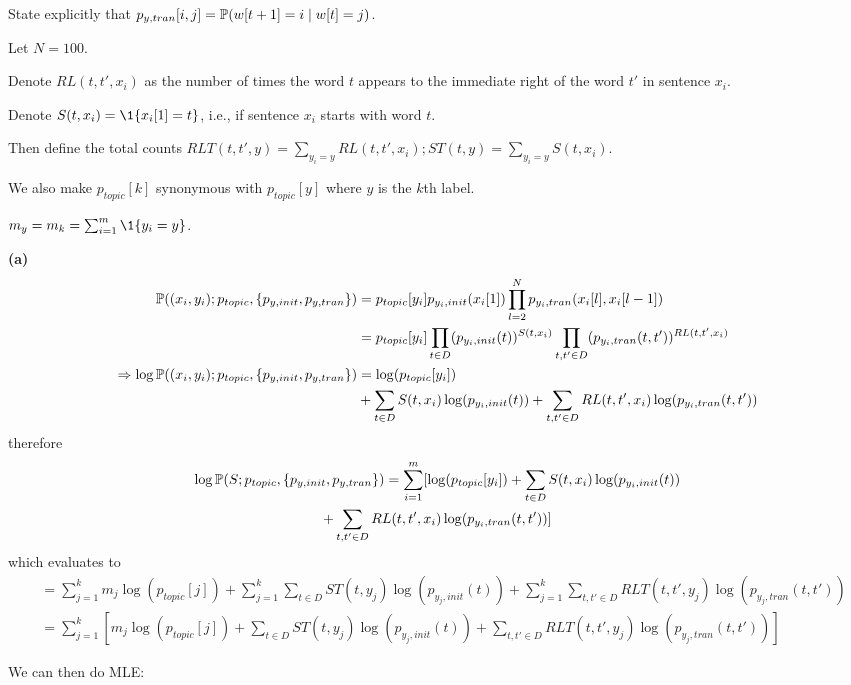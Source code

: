 \documentclass[a4paper, 11pt]{article}
\begin{document}
\begin{problem} 
State explicitly that $p_{y, tran}[i, j] = \mathbb{P} (w[t+1] = i \mid w[t] = j)$.

Let $N = 100$.

Denote $RL(t, t', x_i)$ as the number of times the word $t$ appears to the immediate right of the word $t'$ in sentence $x_i$.

Denote $S(t, x_i) = \1 \{x_i[1] = t\}$, i.e., if sentence $x_i$ starts with word $t$. 

Then define the total counts $RLT(t, t', y) = \sum_{y_i = y} RL(t, t', x_i); ST(t, y) = \sum_{y_i = y} S(t, x_i)$.

We also make $p_{topic}[k]$ synonymous with $p_{topic}[y]$ where $y$ is the $k$th label.

$m_{y} = m_k = \sum_{i=1}^{m} \1 \{y_i = y\}$.

\textbf{(a)} \begin{align*}
\mathbb{P}((x_i, y_i); p_{topic}, \{p_{y, init}, p_{y, tran}\}) &= p_{topic}[y_i]p_{y_i, init}(x_i[1]) \prod_{l=2}^{N} p_{y_i, tran}(x_i[l],  x_i[l-1]) \\
&= p_{topic}[y_i] \prod_{t \in D} (p_{y_i, init}(t))^{S(t, x_i)} \prod_{t, t' \in D} (p_{y_i, tran}(t, t'))^{RL(t, t', x_i)}\\
\Rightarrow \log \mathbb{P}((x_i, y_i); p_{topic}, \{p_{y, init}, p_{y, tran}\}) &=\log(p_{topic}[y_i]) \\
&+ \sum_{t \in D} S(t, x_i) \log (p_{y_i, init}(t)) + \sum_{t, t' \in D} RL(t, t', x_i) \log(p_{y_i, tran}(t, t'))
\end{align*}
therefore \begin{multline*}
    \log \mathbb{P}(S; p_{topic},  \{p_{y, init}, p_{y, tran}\}) = \sum_{i=1}^{m} [\log (p_{topic}[y_i]) + \sum_{t \in D} S(t, x_i) \log(p_{y_i, init}(t)) \\
    + \sum_{t, t' \in D} RL(t, t', x_i) \log(p_{y_i, tran}(t, t'))]
\end{multline*}
which evaluates to \begin{align*}
    &=\sum_{j= 1}^{k} m_j \log(p_{topic}[j]) + \sum_{j=1}^{k} \sum_{t \in D} ST(t, y_j) \log(p_{y_j, init}(t)) + \sum_{j=1}^{k} \sum_{t, t' \in D} RLT(t, t', y_j) \log(p_{y_j, tran}(t, t')) \\
    &=\sum_{j=1}^{k} \left[m_j \log(p_{topic}[j]) + \sum_{t \in D} ST(t, y_j)\log(p_{y_j, init}(t)) + \sum_{t, t' \in D} RLT(t, t', y_j) \log(p_{y_j, tran}(t, t'))\right]
\end{align*}

We can then do MLE:


\end{problem}
\end{document}
